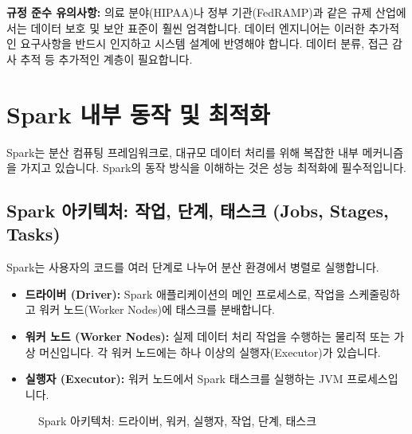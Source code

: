 \documentclass[11pt,a4paper]{article}
\theoremstyle{definition}
\begin{document}
\begin{warningbox}
\textbf{규정 준수 유의사항:}
의료 분야(HIPAA)나 정부 기관(FedRAMP)과 같은 규제 산업에서는 데이터 보호 및 보안 표준이 훨씬 엄격합니다. 데이터 엔지니어는 이러한 추가적인 요구사항을 반드시 인지하고 시스템 설계에 반영해야 합니다. 데이터 분류, 접근 감사 추적 등 추가적인 계층이 필요합니다.
\end{warningbox}

\newpage
\section{Spark 내부 동작 및 최적화}
Spark는 분산 컴퓨팅 프레임워크로, 대규모 데이터 처리를 위해 복잡한 내부 메커니즘을 가지고 있습니다. Spark의 동작 방식을 이해하는 것은 성능 최적화에 필수적입니다.

\subsection{Spark 아키텍처: 작업, 단계, 태스크 (Jobs, Stages, Tasks)}
Spark는 사용자의 코드를 여러 단계로 나누어 분산 환경에서 병렬로 실행합니다.

\begin{itemize}
    \item \textbf{드라이버 (Driver):} Spark 애플리케이션의 메인 프로세스로, 작업을 스케줄링하고 워커 노드(Worker Nodes)에 태스크를 분배합니다.
    \item \textbf{워커 노드 (Worker Nodes):} 실제 데이터 처리 작업을 수행하는 물리적 또는 가상 머신입니다. 각 워커 노드에는 하나 이상의 실행자(Executor)가 있습니다.
    \item \textbf{실행자 (Executor):} 워커 노드에서 Spark 태스크를 실행하는 JVM 프로세스입니다.
\end{itemize}

\begin{figure}[h!]
    \centering
    \caption{Spark 아키텍처: 드라이버, 워커, 실행자, 작업, 단계, 태스크}
    \label{fig:spark_architecture}
\end{figure}
\end{document}
